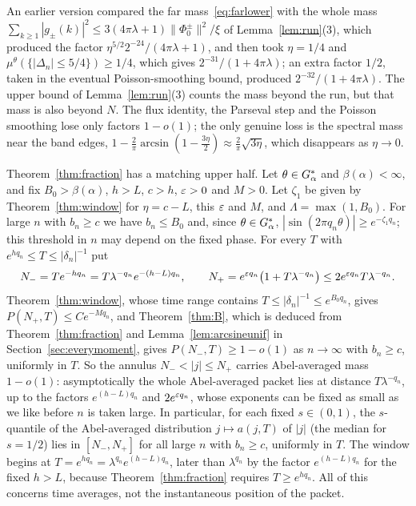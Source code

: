 \begin{remark}\label{rem:oldconstant}
An earlier version compared the far mass~\eqref{eq:farlower} with the whole mass $\sum_{k\ge1}|g_\pm(k)|^2\le3(4\pi\lambda+1)\|\Phi_0^\pm\|^2/\xi$ of Lemma~\ref{lem:run}(3), which produced the factor $\eta^{5/2}2^{-24}/(4\pi\lambda+1)$, and then took $\eta=1/4$ and $\mu^\theta(\{|\Delta_n|\le5/4\})\ge1/4$, which gives $2^{-31}/(1+4\pi\lambda)$; an extra factor $1/2$, taken in the eventual Poisson-smoothing bound, produced $2^{-32}/(1+4\pi\lambda)$. The upper bound of Lemma~\ref{lem:run}(3) counts the mass beyond the run, but that mass is also beyond $N$. The flux identity, the Parseval step and the Poisson smoothing lose only factors $1-o(1)$; the only genuine loss is the spectral mass near the band edges, $1-\frac2\pi\arcsin(1-\frac{3\eta}2)\approx\frac2\pi\sqrt{3\eta}$, which disappears as $\eta\to0$.
\end{remark}

\begin{remark}\label{rem:burst}
Theorem~\ref{thm:fraction} has a matching upper half. Let $\theta\in G_\alpha^*$ and $\beta(\alpha)<\infty$, and fix $B_0>\beta(\alpha)$, $h>L$, $c>h$, $\varepsilon>0$ and $M>0$. Let $\zeta_1$ be given by Theorem~\ref{thm:window} for $\eta=c-L$, this $\varepsilon$ and $M$, and $\Lambda=\max(1,B_0)$. For large $n$ with $b_n\ge c$ we have $b_n\le B_0$ and, since $\theta\in G_\alpha^*$, $|\sin(2\pi q_n\theta)|\ge e^{-\zeta_1q_n}$; this threshold in $n$ may depend on the fixed phase. For every $T$ with $e^{hq_n}\le T\le|\delta_n|^{-1}$ put
\[
N_-=Te^{-hq_n}=T\lambda^{-q_n}e^{-(h-L)q_n},\qquad N_+=e^{\varepsilon q_n}\bigl(1+T\lambda^{-q_n}\bigr)\le2e^{\varepsilon q_n}T\lambda^{-q_n}.
\]
Theorem~\ref{thm:window}, whose time range contains $T\le|\delta_n|^{-1}\le e^{B_0q_n}$, gives $P(N_+,T)\le Ce^{-Mq_n}$, and Theorem~\ref{thm:B}, which is deduced from Theorem~\ref{thm:fraction} and Lemma~\ref{lem:arcsineunif} in Section~\ref{sec:everymoment}, gives $P(N_-,T)\ge1-o(1)$ as $n\to\infty$ with $b_n\ge c$, uniformly in $T$. So the annulus $N_-<|j|\le N_+$ carries Abel-averaged mass $1-o(1)$: asymptotically the whole Abel-averaged packet lies at distance $T\lambda^{-q_n}$, up to the factors $e^{(h-L)q_n}$ and $2e^{\varepsilon q_n}$, whose exponents can be fixed as small as we like before $n$ is taken large. In particular, for each fixed $s\in(0,1)$, the $s$-quantile of the Abel-averaged distribution $j\mapsto a(j,T)$ of $|j|$ (the median for $s=1/2$) lies in $[N_-,N_+]$ for all large $n$ with $b_n\ge c$, uniformly in $T$. The window begins at $T=e^{hq_n}=\lambda^{q_n}e^{(h-L)q_n}$, later than $\lambda^{q_n}$ by the factor $e^{(h-L)q_n}$ for the fixed $h>L$, because Theorem~\ref{thm:fraction} requires $T\ge e^{hq_n}$. All of this concerns time averages, not the instantaneous position of the packet.
\end{remark}

